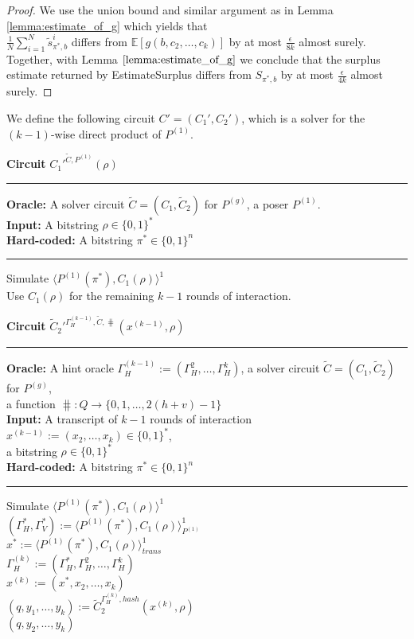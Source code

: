 \begin{proof}
We use the union bound and similar argument as in Lemma \ref{lemma:estimate_of_g}
which yields that \\$\frac{1}{N} \sum_{i=1}^{N} \widetilde{s}_{\pi^*,b}^i$ differs from
$\mathbb{E}[g(b, c_2, \dots, c_k)]$ by at most $\frac{\epsilon}{8k}$ almost surely. Together, with Lemma $\ref{lemma:estimate_of_g}$ we conclude that the surplus estimate
returned by EstimateSurplus differs from $S_{\pi^*,b}$ by at most $\frac{\epsilon}{4k}$ almost surely.
\end{proof}
%
%
We define the following circuit $C' = (C_1', C_2')$, which is a solver for the $(k-1)$-wise direct product of $P^{(1)}$.
\begin{codeblock}
  \textbf{Circuit} $C_1'^{\widetilde{C}, P^{(1)}}(\rho)$
  \medskip \hrule \medskip
  \textbf{Oracle:} A solver circuit $\widetilde{C} = (C_1, \widetilde{C}_2)$ for $P^{(g)}$, a poser $P^{(1)}$. \\
  \textbf{Input:}  A bitstring $\rho \in \{0,1\}^{*}$ \\
  \textbf{Hard-coded:} A bitstring $\pi^* \in \{0,1\}^{n}$
  \medskip\hrule\medskip
  Simulate $\langle P^{(1)}(\pi^*), C_1(\rho)\rangle^1$ \\
  Use $C_1(\rho)$ for the remaining $k-1$ rounds of interaction.
\end{codeblock}
%
%
\begin{codeblock}
  \textbf{Circuit} $\widetilde{C}_2'^{\Gamma_H^{(k-1)}, \widetilde{C}, \hash}(x^{(k-1)}, \rho)$
  \medskip \hrule \medskip
  \textbf{Oracle:} A hint oracle $\Gamma_H^{(k-1)} := (\Gamma_H^{2}, \dots, \Gamma_H^{k})$, a solver circuit $\widetilde{C} = (C_1, \widetilde{C}_2)$ for $P^{(g)}$, \\
  \IndII a function $\hash: Q \rightarrow \{0,1,\dots, 2(h+v)-1\}$ \\
  \textbf{Input:}  A transcript of $k-1$ rounds of interaction $x^{(k-1)} := (x_2, \dotsc, x_{k}) \in \{0,1\}^{*}$, \\
  \IndII a bitstring $\rho \in \{0,1\}^{*}$\\
  \textbf{Hard-coded:} A bitstring $\pi^* \in \{0,1\}^{n}$
  \medskip\hrule\medskip
  Simulate $\langle P^{(1)}(\pi^*), C_1(\rho) \rangle^{1}$ \\
  \IndI $(\Gamma_H^*, \Gamma_V^*) := \langle P^{(1)}(\pi^*), C_1(\rho) \rangle^{1}_{P^{(1)}}$ \\
  \IndI $x^* := \langle P^{(1)}(\pi^*), C_1(\rho) \rangle^{1}_{\mathit{trans}}$ \\
  $\Gamma_H^{(k)} := (\Gamma_H^*, \Gamma_H^{2}, \dots, \Gamma_H^{k})$ \\
  $x^{(k)} := (x^*, x_2, \dots, x_{k})$ \\
  $(q, y_1, \dots, y_k) := \widetilde{C}_2^{\Gamma_H^{(k)}, \mathit{hash}}(x^{(k)}, \rho)$ \\
  \Return $(q, y_2, \dots, y_k)$
\end{codeblock}

